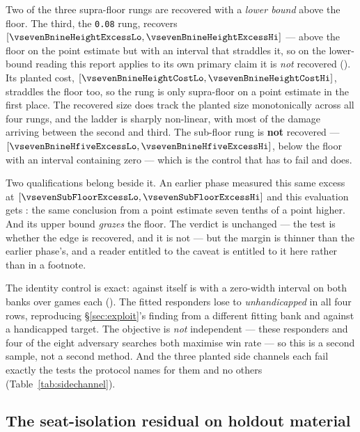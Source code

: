 Two of the three supra-floor rungs are recovered with a \emph{lower bound} above the
\vsevenPrimaryFloor{} floor. The third, the \texttt{0.08} rung, recovers \vsevenBnineHeightExcess{}
$[\vsevenBnineHeightExcessLo, \vsevenBnineHeightExcessHi]$ --- above the floor on the point estimate
but with an interval that straddles it, so on the lower-bound reading this report applies to its own
primary claim it is \emph{not} recovered (\vsevenBnineHeightRecovered{}). Its planted cost,
\vsevenBnineHeightCost{} $[\vsevenBnineHeightCostLo, \vsevenBnineHeightCostHi]$, straddles the floor
too, so the rung is only supra-floor on a point estimate in the first place. The recovered size does
track the planted size monotonically across all four rungs, and the ladder is sharply non-linear,
with most of the damage arriving between the second and third. The sub-floor rung is \textbf{not} recovered ---
\vsevenBnineHfiveExcess{} $[\vsevenBnineHfiveExcessLo, \vsevenBnineHfiveExcessHi]$, below the floor with an
interval containing zero --- which is the control that has to fail and does.

Two qualifications belong beside it. An earlier phase measured this same excess at \vsevenSubFloorExcess{}
$[\vsevenSubFloorExcessLo, \vsevenSubFloorExcessHi]$ and this evaluation gets
\vsevenBnineHfiveExcess{}: the same conclusion from a point
estimate seven tenths of a point higher. And its upper bound \emph{grazes} the floor. The verdict is
unchanged --- the test is whether the edge is recovered, and it is not --- but the margin is thinner
than the earlier phase's, and a reader entitled to the caveat is entitled to it here rather than in a
footnote.

The identity control is exact: \frozen{} against itself is \vsevenIdentityRate{} with a zero-width
interval on both banks over \vsevenIdentityN{} games each (\vsevenIdentityExact{}). The fitted responders lose to \emph{unhandicapped} \frozen{} in all four rows, reproducing
\S\ref{sec:exploit}'s finding from a different fitting bank and against a handicapped target. The
objective is \emph{not} independent --- these responders and four of the eight adversary searches
both maximise win rate --- so this is a second sample, not a second method. And the three planted side channels each fail exactly the
tests the protocol names for them and no others (Table~\ref{tab:sidechannel}).

\subsection{The seat-isolation residual on holdout material}
\label{sec:results-residual}

